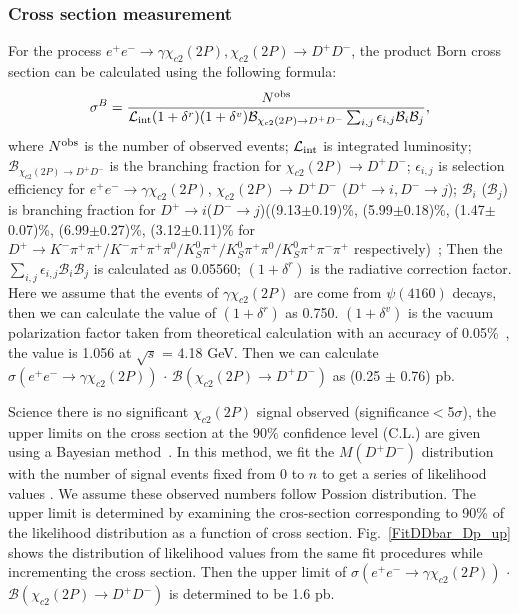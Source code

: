 \documentclass[aps,preprint,tightenlines,superscriptaddress,showpacs,byrevtex,amsmath,amssymb,nofloatfix]{revtex4}
\begin{document}
\subsubsection{Cross section measurement}
For the process $e^{+}e^{-} \rightarrow \gamma \chi_{c2}(2P), \chi_{c2}(2P) \to D^{+}D^{-}$, the product Born cross section can be calculated using the following formula:
\begin{equation}
  \sigma^{B} = \frac{N^{\rm obs}}{\mathcal{L}_{\rm int} (1+\delta^{r}) (1+\delta^{v}) \mathcal{B}_{\chi_{c2}(2P)\rightarrow D^{+}D^{-}} \sum_{i,j}\epsilon_{i,j} \mathcal{B}_{i}\mathcal{B}_{j}},
\end{equation}
where $N^{\rm obs}$ is the number of observed events; $\mathcal{L}_{\rm int}$ is integrated luminosity; $\mathcal{B}_{\chi_{c2}(2P)\rightarrow D^{+}D^{-}}$ is the branching fraction for $\chi_{c2}(2P) \rightarrow D^{+}D^{-}$;  $\epsilon_{i,j}$ is selection efficiency for $e^{+}e^{-} \rightarrow  \gamma \chi_{c2} (2P)$,  $\chi_{c2} (2P) \rightarrow D^{+}D^{-}$ ($D^{+}\rightarrow i, D^{-}\rightarrow j$); $\mathcal{B}_{i}$ ($\mathcal{B}_{j}$) is branching fraction for $D^{+}\rightarrow i$($D^{-}\rightarrow j$)((9.13$\pm$0.19)\%, (5.99$\pm$0.18)\%, (1.47$\pm$0.07)\%, (6.99$\pm$0.27)\%, (3.12$\pm$0.11)\% for $D^{+} \rightarrow K^{-}\pi^{+}\pi^{+}/K^{-}\pi^{+}\pi^{+}\pi^{0}/ K^{0}_{S}\pi^{+}/K^{0}_{S}\pi^{+}\pi^{0}/K^{0}_{S}\pi^{+}\pi^{-}\pi^{+}$ respectively)~\cite{PDG}; Then the $\sum_{i,j}\epsilon_{i,j} \mathcal{B}_{i}\mathcal{B}_{j}$ is calculated as  0.05560; $(1+\delta^{r})$ is the radiative correction factor.  Here we assume that the events of $\gamma \chi_{c2} (2P)$  are come from $\psi(4160)$ decays, then we can calculate the value of  $(1+\delta^{r})$ as 0.750. $(1+\delta^{v})$ is the vacuum polarization factor taken from theoretical calculation with an accuracy of 0.05\%~\cite{vpcalculation}, the value is 1.056 at $\sqrt{s}$ = 4.18 GeV. Then we can calculate $\sigma (e^{+}e^{-}\rightarrow \gamma \chi_{c2} (2P))$ $\cdot$ $\mathcal{B}(\chi_{c2} (2P)\rightarrow D^{+}D^{-})$ as (0.25 $\pm$ 0.76) pb.



Science there is no significant $\chi_{c2}(2P)$ signal observed (significance$<$5$\sigma$), the upper limits on the cross section at the $90\%$ confidence level (C.L.) are given using a Bayesian method~\cite{upperlimit}. In this method, we fit the $M(D^{+}D^{-})$ distribution with the number of signal events fixed from 0 to $n$ to get a series of likelihood values . We assume these observed numbers follow Possion distribution.  The upper limit is determined by examining the cros-section corresponding to 90\% of the likelihood distribution as a function of cross section. Fig.~\ref{FitDDbar_Dp_up} shows the distribution of likelihood values from the same fit procedures while incrementing the cross section. Then the upper limit of $\sigma (e^{+}e^{-}\rightarrow \gamma \chi_{c2} (2P))$ $\cdot$ $\mathcal{B}(\chi_{c2} (2P)\rightarrow D^{+}D^{-})$ is determined to be 1.6 pb.
\end{document}
